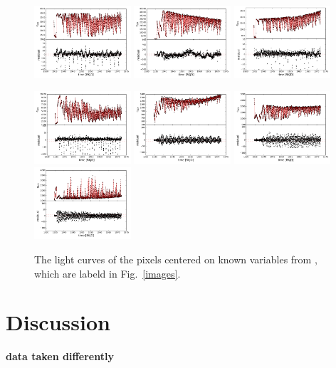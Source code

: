 \documentclass[12pt, preprint]{aastex}
\newcommand{\todo}[1]{\textbf{#1}}
\begin{document}
\begin{figure}[p]
\begin{center}
\includegraphics[width=0.32\textwidth]{f3g}
\hfill
\includegraphics[width=0.32\textwidth]{f3h}
\hfill
\includegraphics[width=0.32\textwidth]{f3i}

\includegraphics[width=0.32\textwidth]{f3j}
\hfill
\includegraphics[width=0.32\textwidth]{f3k}
\hfill
\includegraphics[width=0.32\textwidth]{f3l}
\hfill
\includegraphics[width=0.32\textwidth]{f3m}
\end{center}

\caption{
  \label{variables} 
  The light curves of the pixels centered on known variables from \cite{variables}, which are labeld in Fig.~\ref{images}.
}
\end{figure}


\section{Discussion}
\todo{data taken differently}

\clearpage

\clearpage
\end{document}
